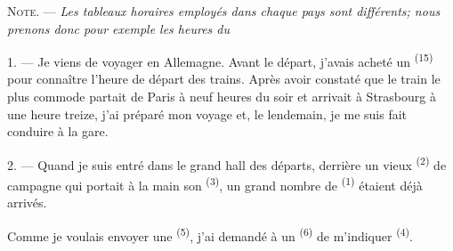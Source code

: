%
%
%
%

\VUsaut{4.0mm}
\VUsaut{2.4mm}
\VUsaut{3.4mm}
\textsc{Note.} --- \textit{Les tableaux horaires employés dans chaque pays sont
différents; nous prenons donc pour exemple les heures du} 

1. --- Je viens de voyager en Allemagne. Avant le départ, j'avais acheté un
 \textsuperscript{(15)} pour connaître l'heure de départ des
trains. Après avoir constaté que le train le plus commode partait de Paris à
neuf heures du soir et arrivait à Strasbourg à une heure treize, j'ai préparé
mon voyage et, le lendemain, je me suis fait conduire à la gare.

2. --- Quand je suis entré dans le grand hall des départs, derrière un vieux
 \textsuperscript{(2)} de campagne qui portait à la main son
 \textsuperscript{(3)}, un grand nombre de
 \textsuperscript{(1)} étaient déjà arrivés.

Comme je voulais envoyer une 
\textsuperscript{(5)}, j'ai demandé à un  \textsuperscript{(6)}
de m'indiquer  \textsuperscript{(4)}.

